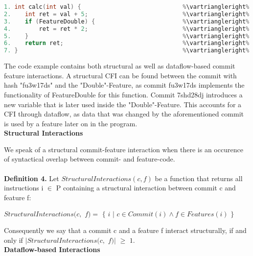 \begin{lstlisting}[language=C++, caption={Commit Feature Interactions}, label=DescriptiveLabel]	
1. int calc(int val) {                             %\vartriangleright% %d93dj4gr%
2.    int ret = val + 5;                           %\vartriangleright% %7shd28dj%
3.    if (FeatureDouble) {                         %\vartriangleright% %fu3w17ds%    %\vartriangleright% %FeatureDouble%
4.        ret = ret * 2;                           %\vartriangleright% %fu3w17ds%    %\vartriangleright% %FeatureDouble%
5.    }                                            %\vartriangleright% %fu3w17ds%    %\vartriangleright% %FeatureDouble%
6.    return ret;                                  %\vartriangleright% %d93dj4gr%   
7. }                                               %\vartriangleright% %d93dj4gr%   
\end{lstlisting}
The code example contains both structural as well as dataflow-based commit feature interactions.
A structural CFI can be found between the commit with hash "fu3w17ds" and the "Double"-Feature, as commit fu3w17ds implements the functionality of FeatureDouble for this function. 
Commit 7shd28dj introduces a new variable that is later used inside the "Double"-Feature. 
This accounts for a CFI through dataflow, as data that was changed by the aforementioned commit is used by a feature later on in the program. \\

\textbf{Structural Interactions} 

We speak of a structural commit-feature interaction when there is an occurence of syntactical overlap between commit- and feature-code. \\ \\
\textbf{Definition 4.} Let $StructuralInteractions(c, f)$ be a function that returns all instructions i $\in$ P containing a structural interaction between commit c and feature f: 
\begin{center} $StructuralInteractions(c,$ $f) = $ $\{$ $i$ $|$ $ c \in Commit(i) \land f \in Features(i)$ $\}$ \end{center}
Consequently we say that a commit c and a feature f interact structurally, if and only if $|StructuralInteractions(c,$ $f)|$ $\geq$ $1$. \\

\textbf{Dataflow-based Interactions} 

